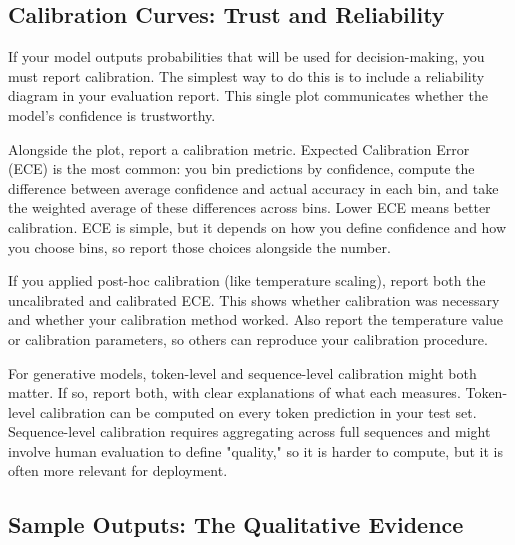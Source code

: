 \vspace{1em}

\subsection{Calibration Curves: Trust and Reliability}

If your model outputs probabilities that will be used for decision-making, you must report calibration. The simplest way to do this is to include a reliability diagram in your evaluation report. This single plot communicates whether the model's confidence is trustworthy.

\vspace{0.3cm}

Alongside the plot, report a calibration metric. Expected Calibration Error (ECE) is the most common: you bin predictions by confidence, compute the difference between average confidence and actual accuracy in each bin, and take the weighted average of these differences across bins. Lower ECE means better calibration. ECE is simple, but it depends on how you define confidence and how you choose bins, so report those choices alongside the number.

\vspace{0.3cm}

If you applied post-hoc calibration (like temperature scaling), report both the uncalibrated and calibrated ECE. This shows whether calibration was necessary and whether your calibration method worked. Also report the temperature value or calibration parameters, so others can reproduce your calibration procedure.

\vspace{0.3cm}

For generative models, token-level and sequence-level calibration might both matter. If so, report both, with clear explanations of what each measures. Token-level calibration can be computed on every token prediction in your test set. Sequence-level calibration requires aggregating across full sequences and might involve human evaluation to define "quality," so it is harder to compute, but it is often more relevant for deployment.

\vspace{1em}

\subsection{Sample Outputs: The Qualitative Evidence}

